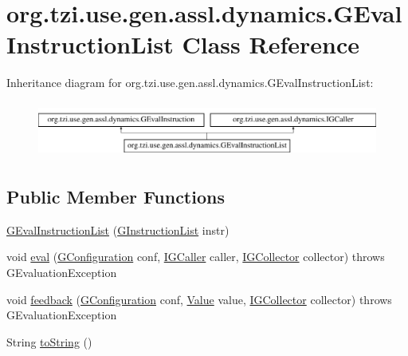 \hypertarget{classorg_1_1tzi_1_1use_1_1gen_1_1assl_1_1dynamics_1_1_g_eval_instruction_list}{\section{org.\-tzi.\-use.\-gen.\-assl.\-dynamics.\-G\-Eval\-Instruction\-List Class Reference}
\label{classorg_1_1tzi_1_1use_1_1gen_1_1assl_1_1dynamics_1_1_g_eval_instruction_list}
}
Inheritance diagram for org.\-tzi.\-use.\-gen.\-assl.\-dynamics.\-G\-Eval\-Instruction\-List\-:\begin{figure}[H]
\begin{center}
\leavevmode
\includegraphics[height=1.854305cm]{classorg_1_1tzi_1_1use_1_1gen_1_1assl_1_1dynamics_1_1_g_eval_instruction_list}
\end{center}
\end{figure}
\subsection*{Public Member Functions}
\begin{DoxyCompactItemize}
\item 
\hyperlink{classorg_1_1tzi_1_1use_1_1gen_1_1assl_1_1dynamics_1_1_g_eval_instruction_list_a2f9cad8784dfc7951b5726614b90afc0}{G\-Eval\-Instruction\-List} (\hyperlink{classorg_1_1tzi_1_1use_1_1gen_1_1assl_1_1statics_1_1_g_instruction_list}{G\-Instruction\-List} instr)
\item 
void \hyperlink{classorg_1_1tzi_1_1use_1_1gen_1_1assl_1_1dynamics_1_1_g_eval_instruction_list_a2cd3d9ed2fafe642b63c37ebc5afe40c}{eval} (\hyperlink{classorg_1_1tzi_1_1use_1_1gen_1_1assl_1_1dynamics_1_1_g_configuration}{G\-Configuration} conf, \hyperlink{interfaceorg_1_1tzi_1_1use_1_1gen_1_1assl_1_1dynamics_1_1_i_g_caller}{I\-G\-Caller} caller, \hyperlink{interfaceorg_1_1tzi_1_1use_1_1gen_1_1assl_1_1dynamics_1_1_i_g_collector}{I\-G\-Collector} collector)  throws G\-Evaluation\-Exception 
\item 
void \hyperlink{classorg_1_1tzi_1_1use_1_1gen_1_1assl_1_1dynamics_1_1_g_eval_instruction_list_aa35b47cf8722193517c1e4b28388ed64}{feedback} (\hyperlink{classorg_1_1tzi_1_1use_1_1gen_1_1assl_1_1dynamics_1_1_g_configuration}{G\-Configuration} conf, \hyperlink{classorg_1_1tzi_1_1use_1_1uml_1_1ocl_1_1value_1_1_value}{Value} value, \hyperlink{interfaceorg_1_1tzi_1_1use_1_1gen_1_1assl_1_1dynamics_1_1_i_g_collector}{I\-G\-Collector} collector)  throws G\-Evaluation\-Exception 
\item 
String \hyperlink{classorg_1_1tzi_1_1use_1_1gen_1_1assl_1_1dynamics_1_1_g_eval_instruction_list_abebe21912a627a5b600721a63763084b}{to\-String} ()
\end{DoxyCompactItemize}
